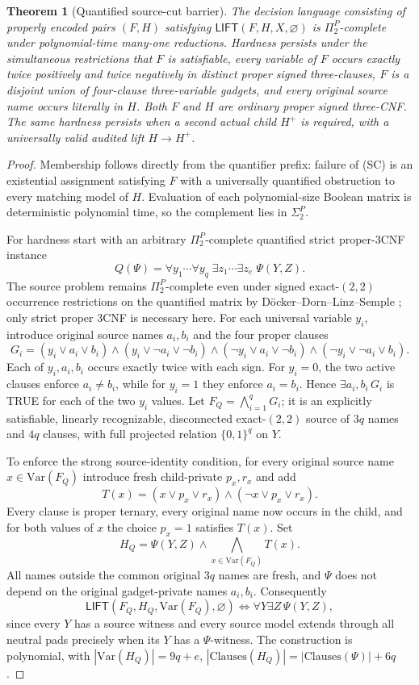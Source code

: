 \documentclass[11pt]{article}
\newtheorem{theorem}{Theorem}
\newcommand{\Lift}{\mathsf{LIFT}}
\begin{document}
\begin{theorem}[Quantified source-cut barrier]\label{th:pi2}
The decision language consisting of properly encoded pairs $(F,H)$ satisfying $\Lift(F,H,X,\varnothing)$ is $\Pi_2^P$-complete under polynomial-time many-one reductions. Hardness persists under the simultaneous restrictions that $F$ is satisfiable, every variable of $F$ occurs exactly twice positively and twice negatively in distinct proper signed three-clauses, $F$ is a disjoint union of four-clause three-variable gadgets, and every original source name occurs literally in $H$. Both $F$ and $H$ are ordinary proper signed three-CNF. The same hardness persists when a second actual child $H^{+}$ is required, with a universally valid audited lift $H\to H^{+}$.
\end{theorem}
\begin{proof}
Membership follows directly from the quantifier prefix: failure of (SC) is an existential assignment satisfying $F$ with a universally quantified obstruction to every matching model of $H$. Evaluation of each polynomial-size Boolean matrix is deterministic polynomial time, so the complement lies in $\Sigma_2^P$.

For hardness start with an arbitrary $\Pi_2^P$-complete quantified strict proper-3CNF instance
\[
Q(\Psi)=\forall y_1\cdots\forall y_q\;\exists z_1\cdots\exists z_e\;\Psi(Y,Z).
\]
The source problem remains $\Pi_2^P$-complete even under signed exact-$(2,2)$ occurrence restrictions on the quantified matrix by D\"ocker--Dorn--Linz--Semple \cite{DDSL}; only strict proper 3CNF is necessary here.
For each universal variable $y_i$, introduce original source names $a_i,b_i$ and the four proper clauses
\[
G_i=(y_i\vee a_i\vee b_i)\wedge(y_i\vee\neg a_i\vee\neg b_i)
\wedge(\neg y_i\vee a_i\vee\neg b_i)
\wedge(\neg y_i\vee\neg a_i\vee b_i).
\]
Each of $y_i,a_i,b_i$ occurs exactly twice with each sign. For $y_i=0$, the two active clauses enforce $a_i\ne b_i$, while for $y_i=1$ they enforce $a_i=b_i$. Hence $\exists a_i,b_i\,G_i$ is TRUE for each of the two $y_i$ values. Let $F_Q=\bigwedge_{i=1}^qG_i$; it is an explicitly satisfiable, linearly recognizable, disconnected exact-$(2,2)$ source of $3q$ names and $4q$ clauses, with full projected relation $\{0,1\}^q$ on $Y$.

To enforce the strong source-identity condition, for every original source name $x\in\mathrm{Var}(F_Q)$ introduce fresh child-private $p_x,r_x$ and add
\[
T(x)=(x\vee p_x\vee r_x)\wedge(\neg x\vee p_x\vee r_x).
\]
Every clause is proper ternary, every original name now occurs in the child, and for both values of $x$ the choice $p_x=1$ satisfies $T(x)$. Set
\[
H_Q=\Psi(Y,Z)\land\bigwedge_{x\in\mathrm{Var}(F_Q)}T(x).
\]
All names outside the common original $3q$ names are fresh, and $\Psi$ does not depend on the original gadget-private names $a_i,b_i$. Consequently
\[
\Lift(F_Q,H_Q,\mathrm{Var}(F_Q),\varnothing)
\iff\forall Y\exists Z\,\Psi(Y,Z),
\]
since every $Y$ has a source witness and every source model extends through all neutral pads precisely when its $Y$ has a $\Psi$-witness. The construction is polynomial, with $|\mathrm{Var}(H_Q)|=9q+e$, $|\mathrm{Clauses}(H_Q)|=|\mathrm{Clauses}(\Psi)|+6q$.


\end{proof}
\end{document}
